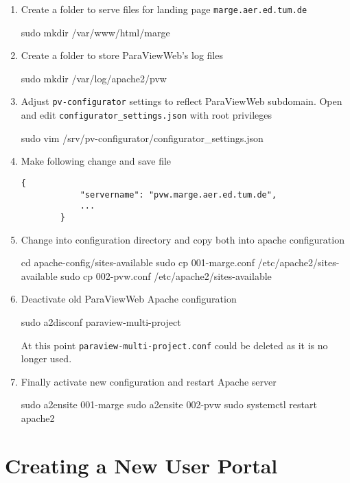 \begin{enumerate}
    \item Create a folder to serve files for landing page
    \texttt{marge.aer.ed.tum.de}
    \begin{terminal}
        sudo mkdir /var/www/html/marge
    \end{terminal}
    \item Create a folder to store ParaViewWeb's log files
    \begin{terminal}
        sudo mkdir /var/log/apache2/pvw
    \end{terminal}
    \item Adjust \texttt{pv-configurator} settings to reflect ParaViewWeb
    subdomain. Open and edit \texttt{configurator\_settings.json} with root
    privileges
    \begin{terminal}
        sudo vim /srv/pv-configurator/configurator_settings.json
    \end{terminal}
    \item Make following change and save file
    \begin{lstlisting}[frame=single]
        {
            "servername": "pvw.marge.aer.ed.tum.de",
            ...
        }
    \end{lstlisting}
    \item Change into configuration directory and copy both into apache
    configuration
    \begin{terminal}
        cd apache-config/sites-available
        sudo cp 001-marge.conf /etc/apache2/sites-available
        sudo cp 002-pvw.conf /etc/apache2/sites-available
    \end{terminal}
    \item Deactivate old ParaViewWeb Apache configuration
    \begin{terminal}
        sudo a2disconf paraview-multi-project
    \end{terminal}
    At this point \texttt{paraview-multi-project.conf} could be deleted as it
    is no longer used.
    \item Finally activate new configuration and restart Apache server
    \begin{terminal}
        sudo a2ensite 001-marge
        sudo a2ensite 002-pvw
        sudo systemctl restart apache2
    \end{terminal}
\end{enumerate}

\section{Creating a New User Portal}


